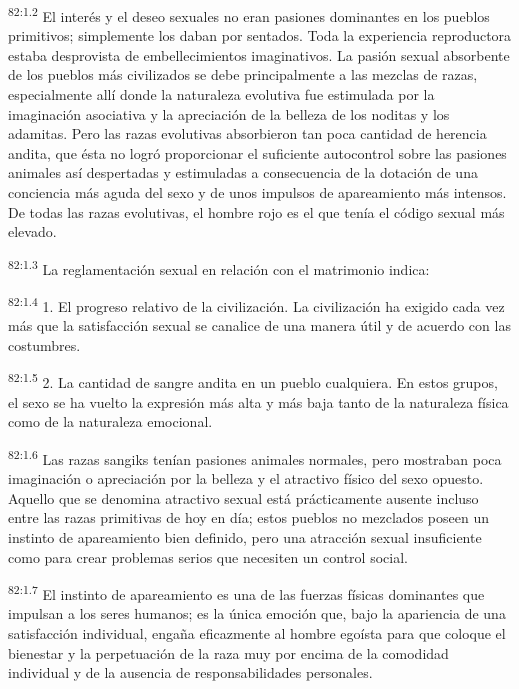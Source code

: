 \par
\textsuperscript{82:1.2} El interés y el deseo sexuales no eran pasiones dominantes en los pueblos primitivos; simplemente los daban por sentados. Toda la experiencia reproductora estaba desprovista de embellecimientos imaginativos. La pasión sexual absorbente de los pueblos más civilizados se debe principalmente a las mezclas de razas, especialmente allí donde la naturaleza evolutiva fue estimulada por la imaginación asociativa y la apreciación de la belleza de los noditas y los adamitas. Pero las razas evolutivas absorbieron tan poca cantidad de herencia andita, que ésta no logró proporcionar el suficiente autocontrol sobre las pasiones animales así despertadas y estimuladas a consecuencia de la dotación de una conciencia más aguda del sexo y de unos impulsos de apareamiento más intensos. De todas las razas evolutivas, el hombre rojo es el que tenía el código sexual más elevado.

\par
\textsuperscript{82:1.3} La reglamentación sexual en relación con el matrimonio indica:

\par
\textsuperscript{82:1.4} 1. El progreso relativo de la civilización. La civilización ha exigido cada vez más que la satisfacción sexual se canalice de una manera útil y de acuerdo con las costumbres.

\par
\textsuperscript{82:1.5} 2. La cantidad de sangre andita en un pueblo cualquiera. En estos grupos, el sexo se ha vuelto la expresión más alta y más baja tanto de la naturaleza física como de la naturaleza emocional.

\par
\textsuperscript{82:1.6} Las razas sangiks tenían pasiones animales normales, pero mostraban poca imaginación o apreciación por la belleza y el atractivo físico del sexo opuesto. Aquello que se denomina atractivo sexual está prácticamente ausente incluso entre las razas primitivas de hoy en día; estos pueblos no mezclados poseen un instinto de apareamiento bien definido, pero una atracción sexual insuficiente como para crear problemas serios que necesiten un control social.

\par
\textsuperscript{82:1.7} El instinto de apareamiento es una de las fuerzas físicas dominantes que impulsan a los seres humanos; es la única emoción que, bajo la apariencia de una satisfacción individual, engaña eficazmente al hombre egoísta para que coloque el bienestar y la perpetuación de la raza muy por encima de la comodidad individual y de la ausencia de responsabilidades personales.

